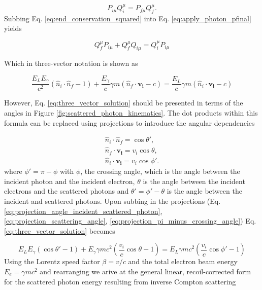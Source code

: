 \documentclass[../main.tex]{subfiles}
\begin{document}
\begin{equation}
P_{i\mu}Q_{i}^{\mu} = P_{f\mu}Q_{f}^{\mu}.
\label{eq:end_conservation_squared}
\end{equation}
Subbing Eq. \ref{eq:end_conservation_squared} into Eq. \ref{eq:apply_photon_pfinal} yields

\begin{equation}
Q_{f}^{\mu}P_{i\mu}+Q_{f}^{\mu}Q_{i\mu} = Q_{i}^{\mu}P_{i\mu}
\label{eq:substitution_four_vector}
\end{equation}

Which in three-vector notation is shown as

\begin{equation}
\frac{E_{L}E_{\gamma}}{c^{2}}\left(\hat{n}_{i}\cdot\hat{n}_{f}-1\right)+\frac{E_{\gamma}}{c}\gamma m\left(\hat{n}_{f}\cdot \boldsymbol{v_{i}}-c\right) = \frac{E_{L}}{c}\gamma m\left(\hat{n}_{i}\cdot \boldsymbol{v_{i}} -c\right)
\label{eq:three_vector_solution}
\end{equation}

However, Eq. \ref{eq:three_vector_solution} should be presented in terms of the angles in Figure \ref{fig:scattered_photon_kinematics}. The dot products within this formula can be replaced using projections to introduce the angular dependencies

\begin{align}
\hat{n}_{i}\cdot\hat{n}_{f} = \cos\theta',
\label{eq:projection_angle_incident_scattered_photon}\\
\hat{n}_{f}\cdot \boldsymbol{v_{i}} = v_{i}\cos\theta,
\label{eq:projection_scattering_angle}\\
\hat{n}_{i}\cdot \boldsymbol{v_{i}} = v_{i}\cos\phi'.
\label{eq:projection_pi_minus_crossing_angle}
\end{align}
where $\phi'=\pi-\phi$ with $\phi$, the crossing angle, which is the angle between the incident photon and the incident electron, $\theta$ is the angle between the incident electrons and the scattered photons and $\theta'=\phi'-\theta$ is the angle between the incident and scattered photons. Upon subbing in the projections (Eq. \ref{eq:projection_angle_incident_scattered_photon}, \ref{eq:projection_scattering_angle}, \ref{eq:projection_pi_minus_crossing_angle}) Eq. \ref{eq:three_vector_solution} becomes

\begin{equation}
E_{L}E_{\gamma}\left(\cos\theta'-1\right)+E_{\gamma}\gamma mc^{2}\left(\frac{v_{i}}{c}\cos\theta-1\right) = E_{L}\gamma mc^{2}\left( \frac{v_{i}}{c}\cos\phi'-1\right)
\label{eq:three_vector_solution_projections}
\end{equation}
Using the Lorentz speed factor $\beta = v/c$ and the total electron beam energy $E_{e} = \gamma mc^{2}$ and rearranging we arive at the general linear, recoil-corrected form for the scattered photon energy resulting from inverse Compton scattering 
\end{document}
